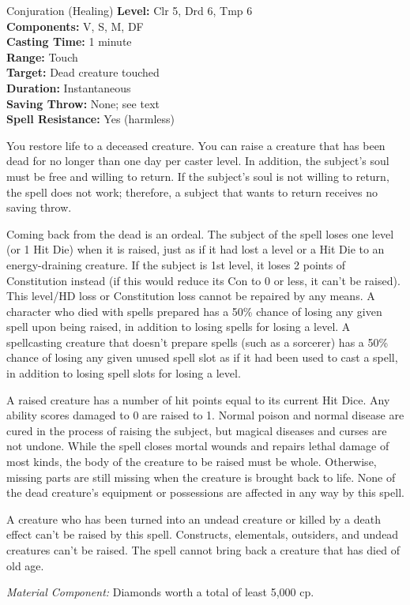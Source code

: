 {Conjuration (Healing)}
{
	\textbf{Level:}
	Clr 5, Drd 6, Tmp 6\\
	\textbf{Components:}
	V, S, M, DF\\
	\textbf{Casting Time:}
	1 minute\\
	\textbf{Range:}
	Touch\\
	\textbf{Target:}
	Dead creature touched\\
	\textbf{Duration:}
	Instantaneous\\
	\textbf{Saving Throw:}
	None; see text\\
	\textbf{Spell Resistance:}
	Yes (harmless)\\
}
{
	You restore life to a deceased creature. You can raise a creature that has been dead for no longer than one day per caster level. In addition, the subject's soul must be free and willing to return. If the subject's soul is not willing to return, the spell does not work; therefore, a subject that wants to return receives no saving throw.

	Coming back from the dead is an ordeal. The subject of the spell loses one level (or 1 Hit Die) when it is raised, just as if it had lost a level or a Hit Die to an energy-draining creature. If the subject is 1st level, it loses 2 points of Constitution instead (if this would reduce its Con to 0 or less, it can't be raised). This level/HD loss or Constitution loss cannot be repaired by any means. A character who died with spells prepared has a 50\% chance of losing any given spell upon being raised, in addition to losing spells for losing a level. A spellcasting creature that doesn't prepare spells (such as a sorcerer) has a 50\% chance of losing any given unused spell slot as if it had been used to cast a spell, in addition to losing spell slots for losing a level.

	A raised creature has a number of hit points equal to its current Hit Dice. Any ability scores damaged to 0 are raised to 1. Normal poison and normal disease are cured in the process of raising the subject, but magical diseases and curses are not undone. While the spell closes mortal wounds and repairs lethal damage of most kinds, the body of the creature to be raised must be whole. Otherwise, missing parts are still missing when the creature is brought back to life. None of the dead creature's equipment or possessions are affected in any way by this spell.

	A creature who has been turned into an undead creature or killed by a death effect can't be raised by this spell. Constructs, elementals, outsiders, and undead creatures can't be raised. The spell cannot bring back a creature that has died of old age.

	\textit{Material Component:}
	Diamonds worth a total of least 5,000 cp.

}
